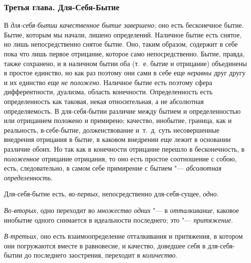 \subsubsection{Третья глава. Для-Себя-Бытие}
В {\em для-себя-бытии качественное бытие завершено}; оно
есть бесконечное бытие. Бытие, которым мы начали, лишено определений.
Наличное бытие есть снятое, но лишь непосредственно снятое бытие. Оно,
таким образом, содержит в себе пока что лишь первое отрицание, которое само
непосредственно. Бытие, правда, также сохранено, и в наличном бытии оба
(т.~е. бытие и отрицание) объединены в простое единство, но как раз поэтому
они сами в себе еще {\em неравны} друг другу и их
единство еще {\em не положено}. Наличное бытие есть
поэтому сфера дифферентности, дуализма, область конечности. Определенность
есть определенность как таковая, некая относительная, а не абсолютная
определяемость. В для-себя-бытии различие между бытием и определенностью
или отрицанием положено и примирено; качество, инобытие, граница, как и
реальность, в-себе-бытие, долженствование и~т.~д. суть несовершенные
внедрения отрицания в бытие, в каковом внедрении еще лежит в основании
различие обоих. Но так как в конечности отрицание перешло в бесконечность,
в {\em положенное} отрицание отрицания, то оно есть
простое соотношение с собою, есть, следовательно, в самом себе примирение с
бытием "--- {\em абсолютная определенность}.

Для-себя-бытие есть, {\em во-первых}, непосредственно
для-себя-сущее, {\em одно}.

{\em Во-вторых}, одно переходит во
{\em множество одних} "--- в
{\em отталкивание}, каковое инобытие одного снимается в
идеальности последнего; это "--- {\em притяжение}.

{\em В-третьих}, оно есть взаимоопределение отталкивания
и притяжения, в котором они погружаются вместе в равновесие, и качество,
доведшее себя в для-себя-бытии до последнего заострения, переходит в
{\em количество}.


